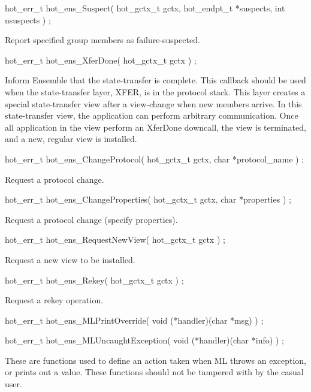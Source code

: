 \documentclass[11pt]{article}
\begin{document}
\begin{codebox}
hot_err_t hot_ens_Suspect(
   hot_gctx_t gctx,
   hot_endpt_t *suspects, 
   int nsuspects
) ;
\end{codebox}
Report specified group members as failure-suspected.

\begin{codebox}
hot_err_t hot_ens_XferDone(
   hot_gctx_t gctx
) ;
\end{codebox}
Inform Ensemble that the state-transfer is complete. 
This callback should be used when the state-transfer layer,
XFER, is in the protocol stack. This layer creates a special
state-transfer view after a view-change when new members arrive. 
In this state-transfer view, the application can perform arbitrary 
communication. Once all application in the view perform an XferDone
downcall, the view is terminated, and a new, regular view is
installed. 

\begin{codebox}
hot_err_t hot_ens_ChangeProtocol(
  hot_gctx_t gctx,
  char *protocol_name
) ;
\end{codebox}
Request a protocol change.

\begin{codebox}
hot_err_t hot_ens_ChangeProperties(
  hot_gctx_t gctx, 
  char *properties
) ;
\end{codebox}
Request a protocol change (specify properties).

\begin{codebox}
hot_err_t hot_ens_RequestNewView(
  hot_gctx_t gctx
) ;
\end{codebox}
Request a new view to be installed.

\begin{codebox}
hot_err_t hot_ens_Rekey(
  hot_gctx_t gctx
) ;
\end{codebox}
Request a rekey operation. 

\begin{codebox}
hot_err_t hot_ens_MLPrintOverride(
  void (*handler)(char *msg)
) ;

hot_err_t hot_ens_MLUncaughtException(
  void (*handler)(char *info)
) ;
\end{codebox}
These are functions used to define an action taken when ML throws an
exception, or prints out a value. These functions should not be
tampered with by the casual user. 
\end{document}
